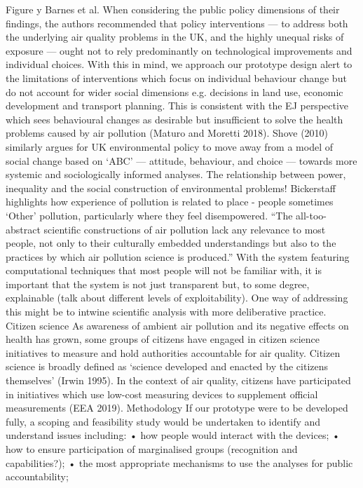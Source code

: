 \documentclass[10pt,english, openany]{book}
\begin{document}
{Figure y Barnes et al. 
When considering the public policy dimensions of their findings, the authors recommended that policy interventions — to address both the underlying air quality problems in the UK, and the highly unequal risks of exposure — ought not to rely predominantly on technological improvements and individual choices. With this in mind, we approach our prototype design alert to the limitations of interventions which focus on individual behaviour change but do not account for wider social dimensions e.g. decisions in land use, economic development and transport planning. This is consistent with the EJ perspective which sees behavioural changes as desirable but insufficient to solve the health problems caused by air pollution (Maturo and Moretti 2018). Shove (2010) similarly argues for UK environmental policy to move away from a model of social change based on ‘ABC’ — attitude, behaviour, and choice — towards more systemic and sociologically informed analyses. 
The relationship between power, inequality and the social construction of environmental problems! Bickerstaff highlights how experience of pollution is related to place - people sometimes ‘Other’ pollution, particularly where they feel disempowered.
“The all-too-abstract scientific constructions of air pollution lack any relevance to most people, not only to their culturally embedded understandings but also to the practices by which air pollution science is produced.”
With the system featuring computational techniques that most people will not be familiar with, it is important that the system is not just transparent but, to some degree, explainable (talk about different levels of exploitability). 
 One way of addressing this might be to intwine scientific analysis with more deliberative practice. 
Citizen science 
As awareness of ambient air pollution and its negative effects on health has grown, some groups of citizens have engaged in citizen science initiatives to measure and hold authorities accountable for air quality. Citizen science is broadly defined as ‘science developed and enacted by the citizens themselves’ (Irwin 1995). In the context of air quality, citizens have participated in initiatives which use low-cost measuring devices to supplement official measurements (EEA 2019). 
Methodology 
If our prototype were to be developed fully, a scoping and feasibility study would be undertaken to identify and understand issues including: 
•	how people would interact with the devices;
•	how to ensure participation of marginalised groups (recognition and capabilities?);
•	the most appropriate mechanisms to use the analyses for public accountability; 
}
\end{document}
